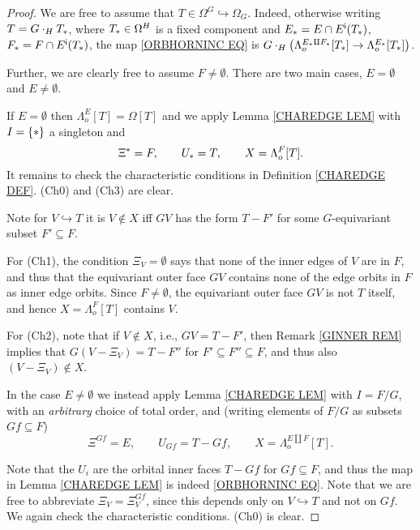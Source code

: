 \documentclass[a4paper,10pt,draft]{article}%
\begin{document}
\begin{proof}
We are free to assume that $T \in \Omega^G \hookrightarrow \Omega_G$. Indeed, otherwise writing $T = G \cdot_H T_{\**}$, where $T_{\**} \in \Omega^H$ is a fixed component and 
$E_{\**}=E \cap E^{\mathsf{i}}(T_{\**})$, $F_{\**} = F \cap E^{\mathsf{i}}(T_{\**})$,
the map \eqref{ORBHORNINC EQ} is
$G \cdot_H 
\left( \Lambda_o^{E_{\**} \amalg F_{\**}}[T_{\**}] \to \Lambda_o^{E_{\**}}[T_{\**}]\right)$.

Further, we are clearly free to assume $F \neq \emptyset$.
There are two main cases, 
$E=\emptyset$ and $E\neq \emptyset$.

If $E=\emptyset$ then $\Lambda_o^{E}[T] = \Omega[T]$ and we apply
Lemma \ref{CHAREDGE LEM} with $I = \{\**\}$ a singleton and
\[
	\Xi^{\**} = F, \qquad 
	U_{\**} = T,\qquad
	X=\Lambda_o^{F}[T].
\]
It remains to check the characteristic conditions in Definition \ref{CHAREDGE DEF}.
	(Ch0) and (Ch3) are clear.
	
	Note for $V\hookrightarrow T$ it is $V \not \in X$ iff 
	$GV$ has the form $T-F'$ for some $G$-equivariant subset
	$F' \subseteq F$.

	For (Ch1), the condition $\Xi_{V} = \emptyset$
	says that none of the inner edges of $V$ are in $F$,
	and thus that the equivariant outer face $G V$ contains none of the edge orbits in $F$ as inner edge orbits. Since $F\neq \emptyset$, the equivariant outer face $GV$ is not $T$ itself, 
	and hence $X=\Lambda_o^{F}[T]$ contains $V$.

	For (Ch2), note that if $V \not \in X$, i.e., 
	$GV = T - F'$, then Remark \ref{GINNER REM} implies that
	$G(V-\Xi_V) = T - F''$ for $F'\subseteq F'' \subseteq F$,
	and thus also $(V-\Xi_V) \not \in X$.
	
	In the case $E \neq \emptyset$ we instead apply Lemma \ref{CHAREDGE LEM} with $I = F/G$, with an 
	\textit{arbitrary} choice of total order, and 
	(writing elements of $F/G$ as subsets $Gf \subseteq F$)
\[
	\Xi^{Gf} = E, \qquad 
	U_{G f}= T - Gf, \qquad
	X=\Lambda_o^{E\amalg F}[T].
\]

Note that the $U_i$ are the orbital inner faces $T - Gf$ for $Gf \subseteq F$, and thus the map
in Lemma \ref{CHAREDGE LEM} is indeed \eqref{ORBHORNINC EQ}.
Note that we are free to abbreviate $\Xi_V = \Xi^{Gf}_V$, since this
depends only on $V \hookrightarrow T$ and not on $Gf$.
We again check the characteristic conditions. (Ch0) is clear.


\end{proof}
\end{document}
